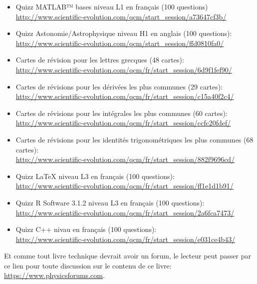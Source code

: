 	 \begin{itemize}
		\item Quizz MATLAB™ bases niveau L1 en français (100 questions)\\ \url{http://www.scientific-evolution.com/qcm/start_session/a73647cf3b/}
		
		\item Quizz Astonomie/Astrophysique niveau H1 en anglais (100 questions):\\ \url{http://www.scientific-evolution.com/qcm/start_session/ffd0810fa0/}
		
		\item Cartes de r\'evision pour les lettres grecques (48 cartes):\\
		\url{http://www.scientific-evolution.com/qcm/fr/start_session/6d9f1fef90/}
		
		\item Cartes de r\'evisions pour les d\'eriv\'ees les plus communes (29 cartes):\\
		\url{http://www.scientific-evolution.com/qcm/fr/start_session/c15a40f2c4/}
		
		\item Cartes de r\'evisions pour les int\'egrales les plus communes (60 cartes):\\
		\url{http://www.scientific-evolution.com/qcm/fr/start_session/ccfc20fdef/}
		
		\item Cartes de r\'evisions pour les identit\'es trigonom\'etriques les plus communes (68 cartes):\\
		\url{http://www.scientific-evolution.com/qcm/fr/start_session/882f9696cd/}
		
		\item Quizz \LaTeX{} niveau L3 en français (100 questions):\\ \url{http://www.scientific-evolution.com/qcm/fr/start_session/ff1e1d1b91/}
		
		\item Quizz R Software 3.1.2 niveau L3 en français (100 questions):\\ \url{http://www.scientific-evolution.com/qcm/fr/start_session/2a6fca7473/}
		
		\item Quizz C++ nivau en français (100 questions):\\
		\url{http://www.scientific-evolution.com/qcm/fr/start_session/e031ce4b43/}
	\end{itemize}
	Et comme tout livre technique devrait avoir un forum, le lecteur peut passer par ce lien pour toute discussion sur le contenu de ce livre: \url{https://www.physicsforums.com}.
	
